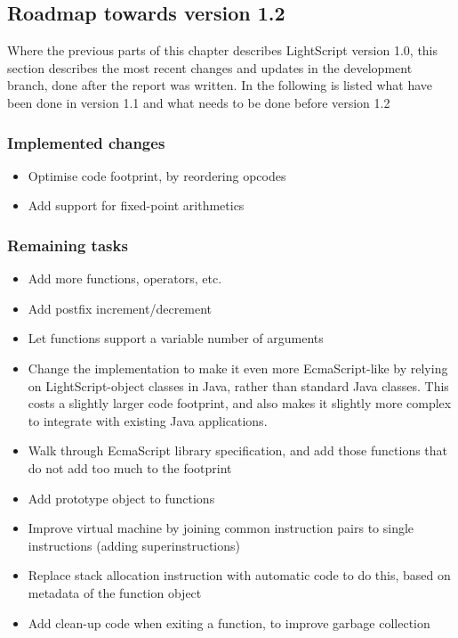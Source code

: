 \documentclass[11pt]{report}
\begin{document}
\subsection{Roadmap towards version 1.2}
Where the previous parts of this chapter describes LightScript version 1.0, this section describes the most recent changes and updates in the development branch, done after the report was written.
In the following is listed what have been done in version 1.1 and what needs to be done before version 1.2
\subsubsection{Implemented changes}
\begin{itemize}
\item Optimise code footprint, by reordering opcodes
\item Add support for fixed-point arithmetics
\end{itemize}
\subsubsection{Remaining tasks}
\begin{itemize}
\item Add more functions, operators, etc. 
\item Add postfix increment/decrement
\item Let functions support a variable number of arguments
\item Change the implementation to make it even more EcmaScript-like by relying on LightScript-object classes in Java, rather than standard Java classes. This costs a slightly larger code footprint, and also makes it slightly more complex to integrate with existing Java applications.
\item Walk through EcmaScript library specification, and add those functions that do not add too much to the footprint
\item Add prototype object to functions
\item Improve virtual machine by joining common instruction pairs to single instructions (adding superinstructions)
\item Replace stack allocation instruction with automatic code to do this, based on metadata of the function object 
\item Add clean-up code when exiting a function, to improve garbage collection
\end{itemize}
\end{document}
